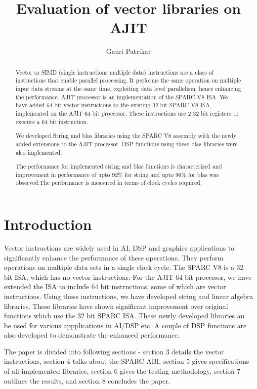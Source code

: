 \documentclass[12pt]{article}
\title{\textbf{Evaluation of vector libraries on AJIT}}
\author[1]{Gauri Patrikar }
\begin{document}
\maketitle
\begin{abstract}

Vector or SIMD (single instructions multiple data) instructions are a class of instructions that enable parallel processing. It performs the same operation on multiple input data streams at the same time, exploiting data level parallelism, hence enhancing the performance.
AJIT processor is an implementation of the SPARC-V8 ISA. 
We have added 64 bit vector instructions to the existing 32 bit SPARC V8 ISA, implemented on the AJIT 64 bit processor. These instructions use 2 32 bit registers to execute a 64 bit instruction.

We developed String and blas libraries using the SPARC V8 assembly with the newly added extensions to the AJIT processor. DSP functions using these blas libraries were also implemented. 
 
The performance for implemented string and blas functions is characterized and improvement in performance of upto 92\% for string and upto 96\% for blas was observed.The performance is measured in terms of clock cycles required.

 \end{abstract}

\section{Introduction}
Vector instructions are widely used in AI, DSP and graphics applications to significantly enhance the performance of these operations. They perform operations on multiple data sets in a single clock cycle. 
The SPARC V8 is a 32 bit ISA, which has no vector instructions. For the AJIT 64 bit processor, we have extended the ISA to include 64 bit instructions, some of which are vector instructions. Using these instructions, we have developed string and linear algebra libraries. These libraries have shown significant improvement over original functions which use the 32 bit SPARC ISA. 
These newly developed libraries an be used for various appplications in AI/DSP etc. A couple of DSP functions are also developed to demonstrate the enhanced performance.

The paper is divided into following sections - section 3 details the vector instructions, section 4 talks about the SPARC ABI, section 5 gives specifications of all implemented libraries, section 6 gives the testing methodology, section 7 outlines the results, and section 8 concludes the paper.
\end{document}
